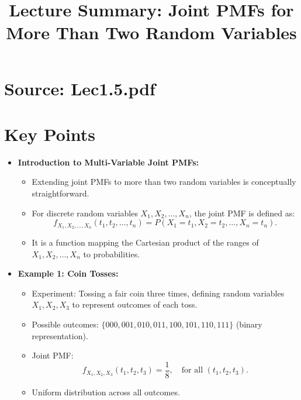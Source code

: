 \documentclass{article}
\title{Lecture Summary: Joint PMFs for More Than Two Random Variables}
\author{}
\date{}
\begin{document}
\maketitle

\section*{Source: Lec1.5.pdf}

\section*{Key Points}

\begin{itemize}
  \item \textbf{Introduction to Multi-Variable Joint PMFs:}
    \begin{itemize}
      \item Extending joint PMFs to more than two random variables is conceptually straightforward.
      \item For discrete random variables $X_1, X_2, \dots, X_n$, the joint PMF is defined as:
        \[
          f_{X_1, X_2, \dots, X_n}(t_1, t_2, \dots, t_n) = P(X_1 = t_1, X_2 = t_2, \dots, X_n = t_n).
        \]
      \item It is a function mapping the Cartesian product of the ranges of $X_1, X_2, \dots, X_n$ to probabilities.
    \end{itemize}

  \item \textbf{Example 1: Coin Tosses:}
    \begin{itemize}
      \item Experiment: Tossing a fair coin three times, defining random variables $X_1, X_2, X_3$ to represent outcomes of each toss.
      \item Possible outcomes: $\{000, 001, 010, 011, 100, 101, 110, 111\}$ (binary representation).
      \item Joint PMF:
        \[
          f_{X_1, X_2, X_3}(t_1, t_2, t_3) = \frac{1}{8}, \quad \text{for all } (t_1, t_2, t_3).
        \]
      \item Uniform distribution across all outcomes.
    \end{itemize}


\end{itemize}
\end{document}
